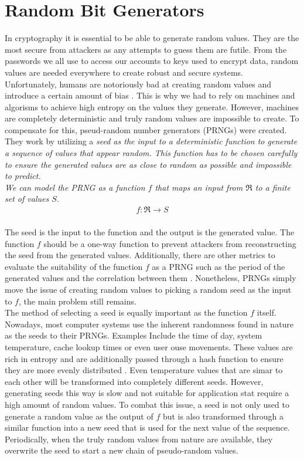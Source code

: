 \section{Random Bit Generators}

In cryptography it is essential to be able to generate random values. They are the most secure from attackers as any attempts to guess them are futile. From the passwords we all use to access our accounts to keys used to encrypt data, random values are needed everywhere to create robust and secure systems.
\\

Unfortunately, humans are notoriously bad at creating random values and introduce a certain amount of bias \cite{human-randomness}. This is why we had to rely on machines and algorisms to achieve high entropy on the values they generate. However, machines are completely deterministic and truly random values are impossible to create. To compensate for this, pseud-random number generators (PRNGs) were created. They work by utilizing a \it{seed} as the input to a deterministic function to generate a sequence of values that appear random. This function has to be chosen carefully to ensure the generated values are as close to random as possible and impossible to predict.
\\

We can model the PRNG as a function $f$ that maps an input from $\Re$ to a finite set of values $S$. \cite{prng}
\begin{align}
    f: \Re \rightarrow S\\
\end{align}

The seed is the input to the function and the output is the generated value. The function $f$ should be a one-way function \cite{one-way-function} to prevent attackers from reconstructing the seed from the generated values. Additionally, there are other metrics to evaluate the suitability of the function $f$ as a PRNG such as the period of the generated values and the correlation between them \cite{prng}. Nonetheless, PRNGs simply move the issue of creating random values to picking a random seed as the input to $f$, the main problem still remains.
\\

The method of selecting a seed is equally important as the function $f$ itself. Nowadays, most computer systems use the inherent randomness found in nature as the seeds to their PRNGs. Examples Include the time of day, system temperature, cache lookup times or even user ouse movements. These values are rich in entropy and are additionally passed through a hash function to ensure they are more evenly distributed \cite{prng}. Even temperature values that are simar to each other will be transformed into completely different seeds. However, generating seeds this way is slow and not suitable for application stat require a high amount of random values. To combat this issue, a seed is not only used to generate a random value as the output of $f$ but is also transformed through a similar function into a new seed that is used for the next value of the sequence. Periodically, when the truly random values from nature are available, they overwrite the seed to start a new chain of pseudo-random values.

